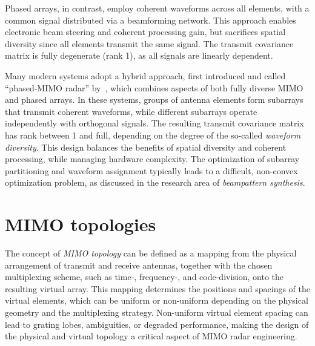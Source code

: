 Phased arrays, in contrast, employ coherent waveforms across all elements, with a common signal distributed via a beamforming network.
This approach enables electronic beam steering and coherent processing gain, but sacrifices spatial diversity since all elements transmit the same signal.
The transmit covariance matrix is fully degenerate (rank 1), as all signals are linearly dependent.

Many modern systems adopt a hybrid approach, first introduced and called \enquote{phased-MIMO radar} by~\textcite{hassanienPhasedMIMORadarTradeoff2010}, which combines aspects of both fully diverse MIMO and phased arrays.
In these systems, groups of antenna elements form subarrays that transmit coherent waveforms, while different subarrays operate independently with orthogonal signals.
The resulting transmit covariance matrix has rank between 1 and full, depending on the degree of the so-called \emph{waveform diversity}.
This design balances the benefits of spatial diversity and coherent processing, while managing hardware complexity.
The optimization of subarray partitioning and waveform assignment typically leads to a difficult, non-convex optimization problem, as discussed in the research area of \emph{beampattern synthesis}.


\section{MIMO topologies}

The concept of \emph{MIMO topology} can be defined as a mapping from the physical arrangement of transmit and receive antennas, together with the chosen multiplexing scheme, such as time-, frequency-, and code-division, onto the resulting virtual array.
This mapping determines the positions and spacings of the virtual elements, which can be uniform or non-uniform depending on the physical geometry and the multiplexing strategy.
Non-uniform virtual element spacing can lead to grating lobes, ambiguities, or degraded performance, making the design of the physical and virtual topology a critical aspect of MIMO radar engineering.

